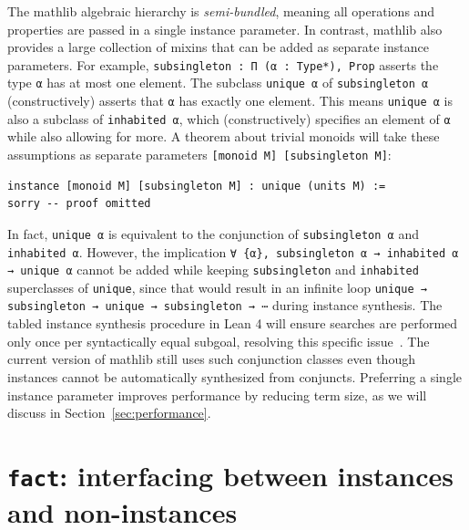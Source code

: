 \documentclass[a4paper,UKenglish,cleveref, autoref, thm-restate]{lipics-v2021}
\newcommand{\mathlib}{\textsf{mathlib}\xspace}
\begin{document}
The \mathlib algebraic hierarchy is \emph{semi-bundled}, meaning all operations and properties are passed in a single instance parameter.
In contrast, \mathlib also provides a large collection of mixins that can be added as separate instance parameters.
For example, \lstinline{subsingleton : Π (α : Type*), Prop} asserts the type \lstinline{α} has at most one element.
The subclass \lstinline{unique α} of \lstinline{subsingleton α} (constructively) asserts that \lstinline{α} has exactly one element.
This means \lstinline{unique α} is also a subclass of \lstinline{inhabited α}, which (constructively) specifies an element of \lstinline{α} while also allowing for more.
A theorem about trivial monoids will take these assumptions as separate parameters \lstinline{[monoid M] [subsingleton M]}:
\begin{lstlisting}
instance [monoid M] [subsingleton M] : unique (units M) :=
sorry -- proof omitted
\end{lstlisting}

In fact, \lstinline{unique α} is equivalent to the conjunction of \lstinline{subsingleton α} and \lstinline{inhabited α}.
However, the implication \lstinline!∀ {α}, subsingleton α → inhabited α → unique α! cannot be added while keeping \lstinline{subsingleton} and \lstinline{inhabited} superclasses of \lstinline{unique},
since that would result in an infinite loop \lstinline{unique → subsingleton → unique → subsingleton → ⋯} during instance synthesis.
The tabled instance synthesis procedure in Lean 4 will ensure searches are performed only once per syntactically equal subgoal, resolving this specific issue~\cite{lean-tabled-typeclasses}.
The current version of \mathlib still uses such conjunction classes even though instances cannot be automatically synthesized from conjuncts.
Preferring a single instance parameter improves performance by reducing term size, as we will discuss in Section~\ref{sec:performance}.

\section{\lstinline{fact}: interfacing between instances and non-instances} \label{sec:fact}
\end{document}
